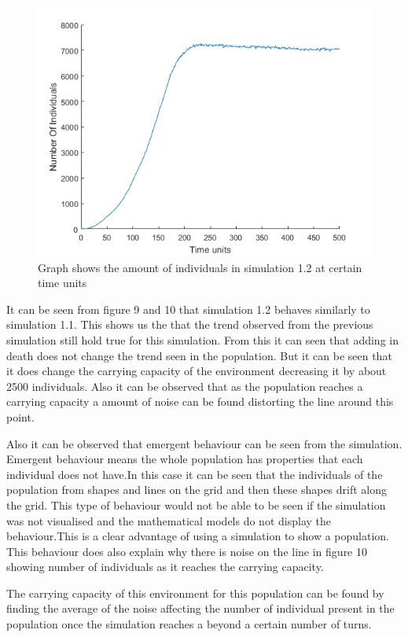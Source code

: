 \documentclass[final]{cmpreport}
\begin{document}
	\begin{figure}[h!] 
		\includegraphics[width=\textwidth]{Simulation1_2GraphNumberIndivuals.png}
		\caption{Graph shows the amount of individuals in simulation 1.2 at certain time units}  
	\end{figure}

	It can be seen from figure 9 and 10 that simulation 1.2 behaves similarly to simulation 1.1. This shows us the that the trend observed from the previous simulation still hold true for this simulation. From this it can seen that adding in death does not change the trend seen in the population. But it can be seen that it does change the carrying capacity of the environment decreasing it by about 2500 individuals. Also it can be observed that as the population reaches a carrying capacity a amount of noise can be found distorting the line around this point.
	
	Also it can be observed that emergent behaviour can be seen from the simulation. Emergent behaviour means the whole population has properties that each individual does not have.In this case it can be seen that the individuals of the population from shapes and lines on the grid and then these shapes drift along the grid. This type of behaviour would not be able to be seen if the simulation was not visualised and the mathematical models do not display the behaviour.This is a clear advantage of using a simulation to show a population. This behaviour does also explain why there is noise on the line in figure 10 showing number of individuals as it reaches the carrying capacity. 
	
	The carrying capacity of this environment for this population can be found by finding the average of the noise affecting the number of individual present in the population once the simulation reaches a beyond a certain number of turns.
		
\end{document}
